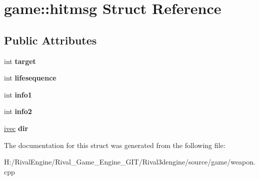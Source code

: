 \hypertarget{structgame_1_1hitmsg}{}\section{game\+:\+:hitmsg Struct Reference}
\label{structgame_1_1hitmsg}
\subsection*{Public Attributes}
\begin{DoxyCompactItemize}
\item 
\mbox{\label{structgame_1_1hitmsg_a39030a03de0769ae6ba01a55d0760947}} 
int {\bfseries target}
\item 
\mbox{\label{structgame_1_1hitmsg_ae0e50d30529254a84ed15ac6e4c83f3b}} 
int {\bfseries lifesequence}
\item 
\mbox{\label{structgame_1_1hitmsg_afcd8c00a4694074318e8f4b3f3f4883c}} 
int {\bfseries info1}
\item 
\mbox{\label{structgame_1_1hitmsg_ad1e24e2ec1f2f0008e6638cc733b019d}} 
int {\bfseries info2}
\item 
\mbox{\label{structgame_1_1hitmsg_a78314fb24d3f864ef72059cfa7a7d400}} 
\hyperlink{structivec}{ivec} {\bfseries dir}
\end{DoxyCompactItemize}


The documentation for this struct was generated from the following file\+:\begin{DoxyCompactItemize}
\item 
H\+:/\+Rival\+Engine/\+Rival\+\_\+\+Game\+\_\+\+Engine\+\_\+\+G\+I\+T/\+Rival3dengine/source/game/weapon.\+cpp\end{DoxyCompactItemize}
